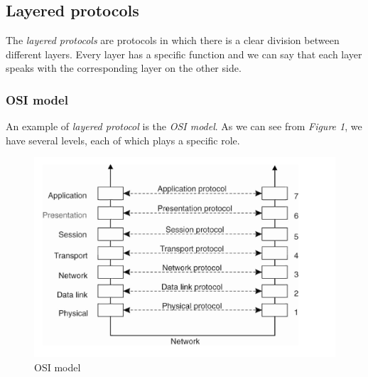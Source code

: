 \subsection{Layered protocols}
The \textit{layered protocols} are protocols in which there is a clear division between different layers. Every layer has a specific function and we can say that each layer speaks with the corresponding layer on the other side.

\subsubsection{OSI model}
An example of \textit{layered protocol} is the \textit{OSI model}. As we can see from \textit{Figure 1}, we have several levels, each of which plays a specific role. 

\begin{figure}[h]
\caption{OSI model}
\includegraphics[width=\textwidth]{src/images/communication/osi-model.png}
\centering
\end{figure}

